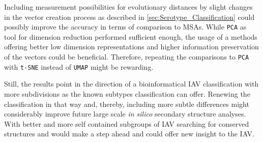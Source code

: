 \vspace{1em}

Including measurement possibilities for evolutionary distances by slight changes in the vector creation process as described in \autoref{sec:Serotype_Classification} could possibly improve the accuracy in terms of comparison to \glspl{MSA}. %
While \texttt{PCA} as tool for dimension reduction performed sufficient enough, the usage of a methods offering better low dimension representations and higher information preservation of the vectors could be beneficial. Therefore, repeating the comparisons to \texttt{PCA} with \texttt{t-SNE} instead of \texttt{UMAP} might be rewarding.

\vspace{1em}

Still, the results point in the direction of a bioinformatical \gls{IAV} classification with more subdivisions as the known subtypes classification can offer. Renewing the classification in that way and, thereby, including more subtle differences might considerably improve future large scale  \textit{in silico} secondary structure analyses. With better and more self contained subgroups of \gls{IAV} searching for conserved structures and would make a step ahead and could offer new insight to the \gls{IAV}.






